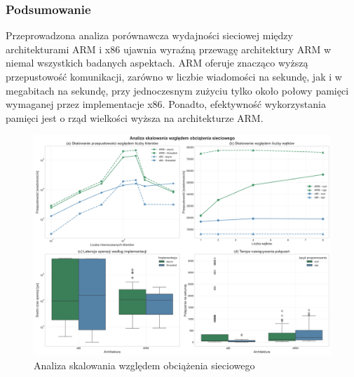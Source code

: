 \subsubsection{Podsumowanie}
Przeprowadzona analiza porównawcza wydajności sieciowej między architekturami ARM i x86 ujawnia wyraźną przewagę architektury ARM w niemal wszystkich badanych aspektach. ARM oferuje znacząco wyższą przepustowość komunikacji, zarówno w liczbie wiadomości na sekundę, jak i w megabitach na sekundę, przy jednoczesnym zużyciu tylko około połowy pamięci wymaganej przez implementacje x86. Ponadto, efektywność wykorzystania pamięci jest o rząd wielkości wyższa na architekturze ARM.

\begin{figure}[H]
    \centering
    \includegraphics[width=\textwidth]{analiza/images/conc/echo/compare/rysunek_2_skalowanie_obciazenia.png}
    \caption{Analiza skalowania względem obciążenia sieciowego}
    \label{rysunek_2_skalowanie_obciazenia}
\end{figure}
